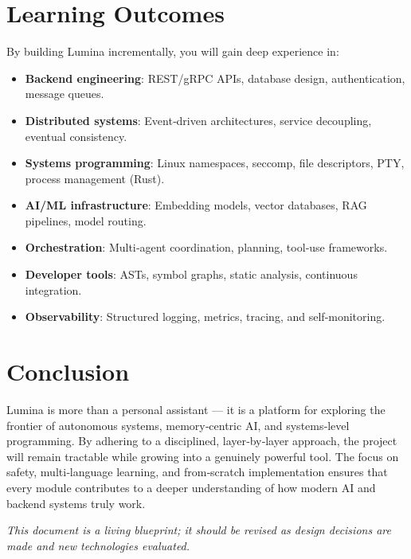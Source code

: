 \documentclass[12pt,a4paper]{article}
\begin{document}
\section{Learning Outcomes}
By building Lumina incrementally, you will gain deep experience in:
\begin{itemize}[leftmargin=*]
    \item \textbf{Backend engineering}: REST/gRPC APIs, database design, authentication, message queues.
    \item \textbf{Distributed systems}: Event‑driven architectures, service decoupling, eventual consistency.
    \item \textbf{Systems programming}: Linux namespaces, seccomp, file descriptors, PTY, process management (Rust).
    \item \textbf{AI/ML infrastructure}: Embedding models, vector databases, RAG pipelines, model routing.
    \item \textbf{Orchestration}: Multi‑agent coordination, planning, tool‑use frameworks.
    \item \textbf{Developer tools}: ASTs, symbol graphs, static analysis, continuous integration.
    \item \textbf{Observability}: Structured logging, metrics, tracing, and self‑monitoring.
\end{itemize}

\section{Conclusion}
Lumina is more than a personal assistant — it is a platform for exploring the frontier of autonomous systems, memory‑centric AI, and systems‑level programming. By adhering to a disciplined, layer‑by‑layer approach, the project will remain tractable while growing into a genuinely powerful tool. The focus on safety, multi‑language learning, and from‑scratch implementation ensures that every module contributes to a deeper understanding of how modern AI and backend systems truly work.

\vspace{0.5cm}
\noindent \textit{This document is a living blueprint; it should be revised as design decisions are made and new technologies evaluated.}
\end{document}
